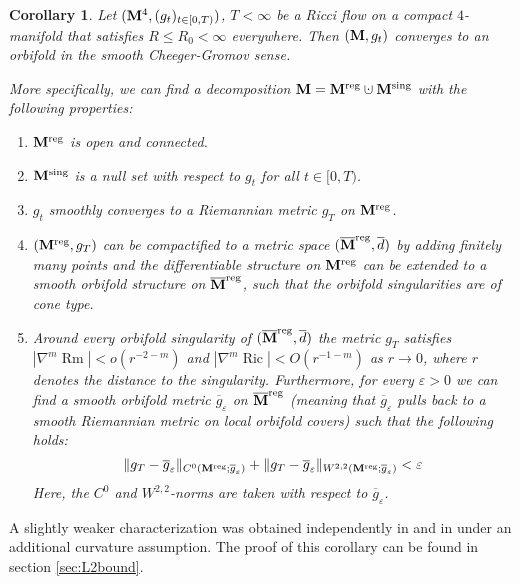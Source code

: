 \documentclass[11pt]{amsart}
\numberwithin{equation}{section}
\newcommand{\dotcup}{\mathbin{\mathaccent\cdot\cup}}
\newtheorem{corollary}[theorem]{Corollary}
\def\eps{\varepsilon}
\def\M{{\bf M}}
\def\eps{\varepsilon}
\DeclareMathOperator{\Ric}{Ric}
\DeclareMathOperator{\Rm}{Rm}
\numberwithin{equation}{section}
\begin{document}
\begin{corollary} \label{Cor:convergenceorbifold}
Let $(\M^4, (g_t)_{t \in [0,T)})$, $T < \infty$ be a Ricci flow on a compact $4$-manifold that satisfies $R \leq R_0 < \infty$ everywhere.
Then $(\M, g_t)$ converges to an orbifold in the smooth Cheeger-Gromov sense.

More specifically, we can find a decomposition $\M = \M^{\textnormal{reg}} \dotcup \M^{\textnormal{sing}}$ with the following properties:
\begin{enumerate}[label=(\alph*)]
\item $\M^{\textnormal{reg}}$ is open and connected.
\item $\M^{\textnormal{sing}}$ is a null set with respect to $g_t$ for all $t \in [0,T)$.
\item $g_t$ smoothly converges to a Riemannian metric $g_T$ on $\M^{\textnormal{reg}}$.
\item $(\M^{\textnormal{reg}}, g_T)$ can be compactified to a metric space $(\overline{\M}^{\textnormal{reg}}, \overline{d})$ by adding finitely many points and the differentiable structure on $\M^{\textnormal{reg}}$ can be extended to a smooth orbifold structure on $\overline{\M}^{\textnormal{reg}}$, such that the orbifold singularities are of cone type.
\item Around every orbifold singularity of $(\overline{\M}^{\textnormal{reg}}, \overline{d})$ the metric $g_T$ satisfies $|\nabla^m {\Rm} | < o (r^{-2-m})$ and $|\nabla^m {\Ric}| < O(r^{-1-m})$ as $r \to 0$, where $r$ denotes the distance to the singularity.
Furthermore, for every $\eps > 0$ we can find a smooth orbifold metric $\overline{g}_\eps$ on $\overline{\M}^{\textnormal{reg}}$ (meaning that $\overline{g}_\eps$ pulls back to a smooth Riemannian metric on local orbifold covers) such that the following holds:
\[ \Vert g_T - \overline{g}_\eps \Vert_{C^0(\M^{\textnormal{reg}}; \overline{g}_\eps )} + \Vert g_T - \overline{g}_\eps \Vert_{W^{2,2}(\M^{\textnormal{reg}}; \overline{g}_\eps)} < \eps \]
Here, the $C^0$ and $W^{2,2}$-norms are taken with respect to $\overline{g}_\eps$.
\end{enumerate}
\end{corollary}
A slightly weaker characterization was obtained independently in \cite{Simon:2} and in \cite{CW:1} under an additional curvature assumption.
The proof of this corollary can be found in section \ref{sec:L2bound}.
\end{document}
